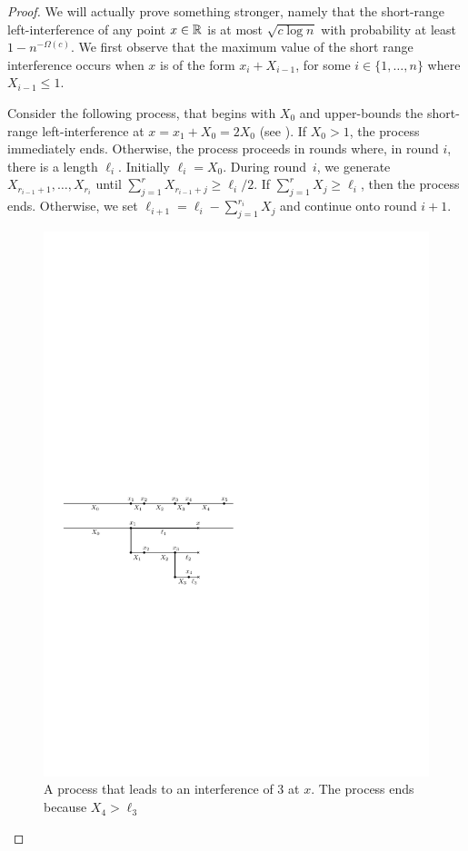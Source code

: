 \documentclass{patmorin}
\begin{document}
\begin{proof}
We will actually prove something stronger, namely that the short-range
left-interference of any point $x\in\mathbb{R}$ is at most $\sqrt{c\log n}$
with probability at least $1-n^{-\Omega(c)}$.  We first observe that the
maximum value of the short range interference occurs when $x$ is of the
form $x_{i} + X_{i-1}$, for some $i\in\{1,\ldots,n\}$ where $X_{i-1}
\le 1$.

Consider the following process, that begins with $X_0$ and
upper-bounds the short-range left-interference at $x=x_1+X_0=2X_0$
(see ). If $X_0>1$, the process immediately ends.
Otherwise, the process proceeds in rounds where, in round $i$, there
is a length $\ell_i$.  Initially $\ell_i=X_0$.  During round~$i$, we
generate $X_{r_{i-1}+1},\ldots,X_{r_i}$ until $\sum_{j=1}^r X_{r_{i-1}+j}
\ge \ell_i/2$.  If $\sum_{j=1}^r X_j \ge \ell_i$, then the process ends.
Otherwise, we set $\ell_{i+1} = \ell_i-\sum_{j=1}^{r_i} X_j$ and continue
onto round $i+1$.

\begin{figure}
  \begin{center}\includegraphics{upper-bound}\end{center}
  \caption{A process that leads to an interference of 3 at $x$.  The process ends because $X_4 > \ell_3$}
\end{figure}


\end{proof}
\end{document}
